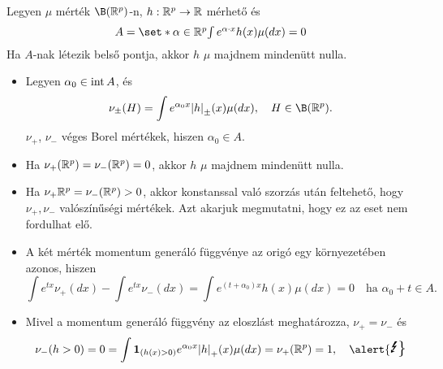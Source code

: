 \documentclass[aspectratio=169,notheorems,9pt,\option]{beamer}
\begin{document}
\begin{frame}%
  \begin{theorem}
    Legyen $\mu$ mérték $\B (\real^p)$-n, $h:\mathbb{R}^p\to\mathbb{R}$ mérhető és 
    \begin{displaymath}\textstyle
      A=\set*{\alpha\in\real^p}{\int e^{\alpha \cdot x}h (x)\mu
        (dx)=0}%
    \end{displaymath}
    Ha $A$-nak létezik belső pontja, akkor $h$ $\mu$ majdnem mindenütt nulla.
  \end{theorem}
  \begin{itemize}
  \item Legyen $\alpha_0\in\operatorname{int} A$, és
    \begin{displaymath}
      \nu_{\pm} (H)=\int e^{\alpha_0x}\abs*{h}_\pm (x) \mu (d x),\quad H\in\B(\real^p).
    \end{displaymath}
    $\nu_{+}$, $\nu_{-}$ véges Borel mértékek,  hiszen $\alpha_0\in A$.
  \item  Ha $\nu_{+} (\mathbb{R}^p)=\nu_{-} (\mathbb{R}^p) = 0$, akkor $h$ $\mu$ majdnem mindenütt
    nulla.
  \item Ha $\nu_{+}{\mathbb{R}^p}=\nu_{-} (\mathbb{R}^p)>0$, akkor konstanssal
    való szorzás után feltehető, hogy $\nu_{+},\nu_{-}$ valószínűségi
    mértékek. Azt akarjuk megmutatni, hogy ez az eset nem fordulhat
    elő. 
    
  \item A két mérték momentum generáló függvénye az origó egy
    környezetében azonos, hiszen
    \begin{displaymath}
      \int e^{t x}\nu_{+} (d x)-\int e^{t x}\nu_{-} (d x)=\int
      e^{(t+\alpha_0)x}h (x)\mu (d x)=0
          \quad\text{ha $\alpha_0+t\in A$.}
    \end{displaymath}
  \item Mivel a momentum generáló függvény az eloszlást meghatározza,
    $\nu_{+}=\nu_{-}$ és %
    \begin{displaymath}
      \nu_{-} (h>0)=0=
      \int \I{h (x) >0} e^{\alpha_0 x}\abs*{h}_+ (x)\mu (d x)=
      \nu_{+} (\real^p)=1,
      \quad\text{\alert{\Large\Lightning}}
    \end{displaymath}
  \end{itemize}
\end{frame}
\end{document}

